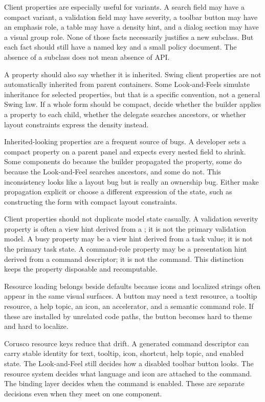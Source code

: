 Client properties are especially useful for variants. A search field may have a compact variant, a validation field may have severity, a toolbar button may have an emphasis role, a table may have a density hint, and a dialog section may have a visual group role. None of those facts necessarily justifies a new subclass. But each fact should still have a named key and a small policy document. The absence of a subclass does not mean absence of API.

A property should also say whether it is inherited. Swing client properties are not automatically inherited from parent containers. Some Look-and-Feels simulate inheritance for selected properties, but that is a specific convention, not a general Swing law. If a whole form should be compact, decide whether the builder applies a property to each child, whether the delegate searches ancestors, or whether layout constraints express the density instead.

Inherited-looking properties are a frequent source of bugs. A developer sets a compact property on a parent panel and expects every nested field to shrink. Some components do because the builder propagated the property, some do because the Look-and-Feel searches ancestors, and some do not. This inconsistency looks like a layout bug but is really an ownership bug. Either make propagation explicit or choose a different expression of the state, such as constructing the form with compact layout constraints.

Client properties should not duplicate model state casually. A validation severity property is often a view hint derived from a ; it is not the primary validation model. A busy property may be a view hint derived from a task value; it is not the primary task state. A command-role property may be a presentation hint derived from a command descriptor; it is not the command. This distinction keeps the property disposable and recomputable.

Resource loading belongs beside defaults because icons and localized strings often appear in the same visual surfaces. A button may need a text resource, a tooltip resource, a help topic, an icon, an accelerator, and a semantic command role. If these are installed by unrelated code paths, the button becomes hard to theme and hard to localize.

Corusco resource keys reduce that drift. A generated command descriptor can carry stable identity for text, tooltip, icon, shortcut, help topic, and enabled state. The Look-and-Feel still decides how a disabled toolbar button looks. The resource system decides what language and icon are attached to the command. The binding layer decides when the command is enabled. These are separate decisions even when they meet on one component.

